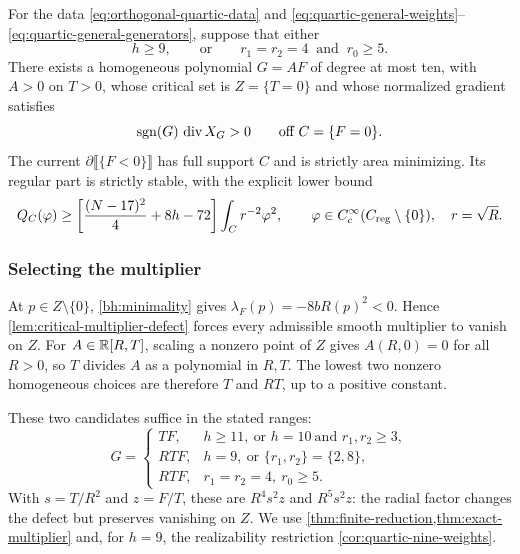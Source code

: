 \begin{theorem}
\label{thm:quartic-table-existence}
For the data \eqref{eq:orthogonal-quartic-data} and
\eqref{eq:quartic-general-weights}--\eqref{eq:quartic-general-generators},
suppose that either
\[
 h\geq9,
 \qquad\text{or}\qquad
 r_1=r_2=4\ \text{ and }\ r_0\geq5.
\]
There exists a homogeneous polynomial $G=AF$ of degree at most ten,
with $A>0$ on $T>0$, whose critical set is $Z=\{T=0\}$ and whose
normalized gradient satisfies
\[
 \operatorname{sgn}(G)\,\operatorname{div} X_G>0\qquad\text{off }C=\{F=0\}.
\]
The current $\partial\llbracket\{F<0\}\rrbracket$ has full support
$C$ and is strictly area minimizing.  Its regular part is strictly
stable, with the explicit lower bound
\begin{equation}\label{eq:bihomogeneous-Hardy}
 Q_C(\varphi)\geq
 \left[\frac{(N-17)^2}{4}+8h-72\right]
 \int_Cr^{-2}\varphi^2,\qquad
 \varphi\in C_c^\infty(C_{\mathrm{reg}}\setminus\{0\}),\quad r=\sqrt R.
\end{equation}
\end{theorem}

\subsubsection{Selecting the multiplier}

At $p\in Z\setminus\{0\}$, \eqref{bh:minimality} gives
$\lambda_F(p)=-8bR(p)^2<0$. Hence
\cref{lem:critical-multiplier-defect} forces every admissible smooth
multiplier to vanish on $Z$.
For $A\in\mathbb R[R,T]$, scaling a nonzero point of $Z$ gives
$A(R,0)=0$ for all $R>0$, so $T$ divides $A$ as a polynomial in
$R,T$.  The lowest two nonzero homogeneous choices are therefore
$T$ and $RT$, up to a positive constant.

These two candidates suffice in the stated ranges:
\begin{equation}\label{bh:potentials}
 G=\begin{cases}
 TF,&h\geq11,\ \text{or }h=10\ \text{and }r_1,r_2\geq3,\\
 RTF,&h=9,\ \text{or }\{r_1,r_2\}=\{2,8\},\\
 RTF,&r_1=r_2=4,\ r_0\geq5.
 \end{cases}
\end{equation}
With $s=T/R^2$ and $z=F/T$, these are $R^4s^2z$ and $R^5s^2z$:
the radial factor changes the defect but preserves vanishing on $Z$.
We use \cref{thm:finite-reduction,thm:exact-multiplier} and, for
$h=9$, the realizability restriction \cref{cor:quartic-nine-weights}.

